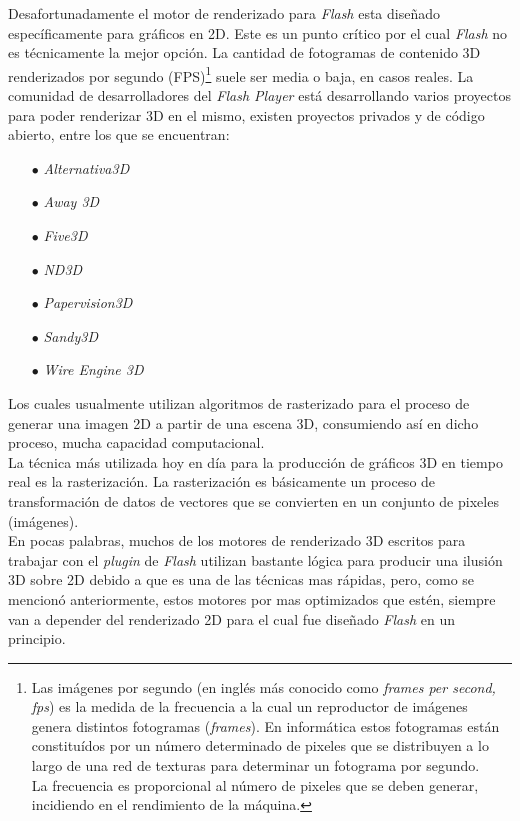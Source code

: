 Desafortunadamente el motor de renderizado para \emph{Flash} esta diseñado específicamente para gráficos en 2D. Este es un punto crítico por el cual \emph{Flash} no es técnicamente la mejor opción. La cantidad de fotogramas de contenido 3D renderizados por segundo (FPS)\footnote{Las imágenes por segundo (en inglés más conocido como \emph{frames per second, fps}) es la medida de la frecuencia a la cual un reproductor de imágenes genera distintos fotogramas (\emph{frames}). En informática estos fotogramas están constituídos por un número determinado de pixeles que se distribuyen a lo largo de una red de texturas para determinar un fotograma por segundo.\\
La frecuencia es proporcional al número de pixeles que se deben generar, incidiendo en el rendimiento de la máquina.} suele ser media o baja, en casos reales. La comunidad de desarrolladores del \emph{Flash Player} está desarrollando varios proyectos para poder renderizar 3D en el mismo, existen proyectos privados y de código abierto, entre los que se encuentran: \\
\begin{itemize}
\item[$\bullet$] \emph{Alternativa3D} 
\item[$\bullet$] \emph{Away 3D} 
\item[$\bullet$] \emph{Five3D} 
\item[$\bullet$] \emph{ND3D} 
\item[$\bullet$] \emph{Papervision3D} 
\item[$\bullet$] \emph{Sandy3D} 
\item[$\bullet$] \emph{Wire Engine 3D}
\end{itemize} 
Los cuales usualmente utilizan algoritmos de rasterizado para el proceso de generar una imagen 2D a partir de una escena 3D, consumiendo así en dicho proceso, mucha capacidad computacional.\\

La técnica más utilizada hoy en día para la producción de gráficos 3D en tiempo real es la rasterización. La rasterización es básicamente un proceso de transformación de datos de vectores que se convierten en un conjunto de pixeles (imágenes).\\

En pocas palabras, muchos de los motores de renderizado 3D escritos para trabajar con el \emph{plugin} de \emph{Flash}  utilizan bastante lógica para producir una ilusión 3D sobre 2D debido a que es una de las técnicas mas rápidas, pero, como se mencionó anteriormente, estos motores por mas optimizados que estén, siempre van a depender del renderizado 2D para el cual fue diseñado \emph{Flash} en un principio.\\

